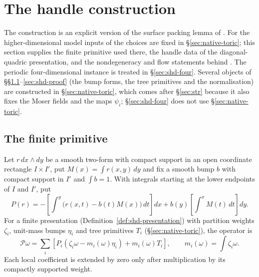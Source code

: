 \section{The handle construction}\label{sec:shd}

The construction is an explicit version of the surface packing lemma of \cite[\S3.2]{OpenAI2026}. For the
higher-dimensional model inputs of  the choices are fixed in \S\ref{sec:native-toric};
this section supplies the finite primitive used there, the handle data of the diagonal-quadric presentation, and the
nondegeneracy and flow statements behind . The periodic four-dimensional instance is treated in
\S\ref{sec:shd-four}. Several objects of \S\S\ref{sec:shd-primitive}--\ref{sec:shd-proof} (the bump forms, the tree primitives and the
normalisation) are constructed in \S\ref{sec:native-toric}, which comes after \S\ref{sec:str} because it also fixes the
Moser fields and the maps $\psi_i$; \S\ref{sec:shd-four} does not use \S\ref{sec:native-toric}.

\subsection{The finite primitive}\label{sec:shd-primitive}

\begin{construction}\label{cons:shd-primitive}
Let $r\,dx\wedge dy$ be a smooth two-form with compact support in an open coordinate rectangle $I\times I'$, put
$M(x)=\int r(x,y)\,dy$ and fix a smooth bump $b$ with compact support in $I'$ and $\int b=1$. With integrals starting
at the lower endpoints of $I$ and $I'$, put
\begin{equation}\label{eq:shd-Ploc}
 P(r)=-\left[\int^y\bigl(r(x,t)-b(t)M(x)\bigr)\,dt\right]dx
       +b(y)\left[\int^xM(t)\,dt\right]dy .
\end{equation}
For a finite presentation (Definition~\ref{def:shd-presentation}) with partition weights $\zeta_i$, unit-mass bumps
$\eta_i$ and tree primitives $T_i$ (\S\ref{sec:native-toric}), the operator is
\begin{equation}\label{eq:shd-PSigma}
 \mathcal P\omega=\sum_i\left[P_i(\zeta_i\omega-m_i(\omega)\eta_i)+m_i(\omega)T_i\right],\qquad m_i(\omega)=\int\zeta_i\omega .
\end{equation}
Each local coefficient is extended by zero only after multiplication by its compactly supported weight.
\end{construction}

